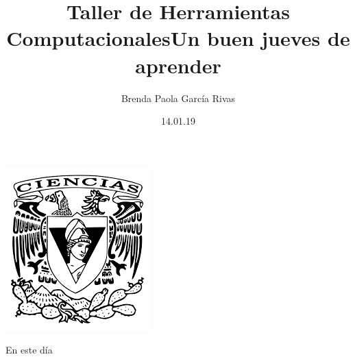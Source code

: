 \documentclass[letterpaper, 12pt,oneside]{article}
\title{\huge\color{orange}Taller de Herramientas Computacionales}
\author{Brenda Paola García Rivas}
\date{14.01.19}
\begin{document}
	\maketitle
	\begin{center}
		\includegraphics[scale=0.98]{1.png}
	\end{center}
	\newpage
	\title{\huge Un buen jueves de aprender\\}
	
	En este día 
\end{document}

